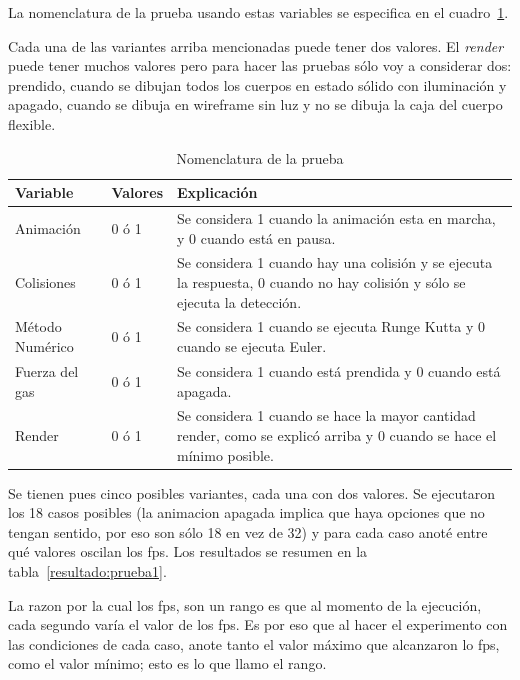 La nomenclatura de la prueba usando estas variables se especifica en el cuadro~\ref{nomenclatura:prueba}.

Cada una de las variantes arriba mencionadas puede tener dos valores.
El \emph{\foreignlanguage{english}{render}} puede tener muchos valores pero para hacer las pruebas sólo voy a considerar dos: prendido, cuando se dibujan todos los cuerpos en estado sólido con iluminación y apagado, cuando se dibuja en wireframe sin luz y no se dibuja la caja del cuerpo flexible.

\begin{table}
\begin{center}
\begin{tabular} {@{}llp{10cm}@{}}
\toprule
 Variable & Valores & Explicación\\
\midrule 
 Animación & 0 ó 1 & Se considera 1 cuando la animación esta en marcha, y 0 cuando está en pausa. \\
 Colisiones & 0 ó 1 & Se considera 1 cuando hay una colisión y se ejecuta la respuesta, 0 cuando no hay colisión y sólo se ejecuta la detección. \\
 Método Numérico & 0 ó 1 & Se considera 1 cuando se ejecuta Runge Kutta y 0 cuando se ejecuta Euler. \\
 Fuerza del gas & 0 ó 1 & Se considera 1 cuando está prendida y 0 cuando está apagada. \\
 Render & 0 ó 1 & Se considera 1 cuando se hace la mayor cantidad render, como se explicó arriba y 0 cuando se hace el mínimo posible. \\
\bottomrule
\end{tabular}
\end{center}
\caption[Explicación de la nomenclatura de la prueba del programa]{Nomenclatura de la prueba}
\label{nomenclatura:prueba}
\end{table}

Se tienen pues cinco posibles variantes, cada una con dos valores.
Se ejecutaron los 18 casos posibles (la animacion apagada implica que haya opciones que no tengan sentido, por eso son sólo 18 en vez de 32) y para cada caso anoté entre qué valores oscilan los fps. Los resultados se resumen en la tabla~\ref{resultado:prueba1}.

La razon por la cual los fps, son un rango es que al momento de la ejecución, cada segundo varía el valor de los fps.
Es por eso que al hacer el experimento con las condiciones de cada caso, anote tanto el valor máximo que alcanzaron lo fps, como el valor mínimo; esto es lo que llamo el rango.

